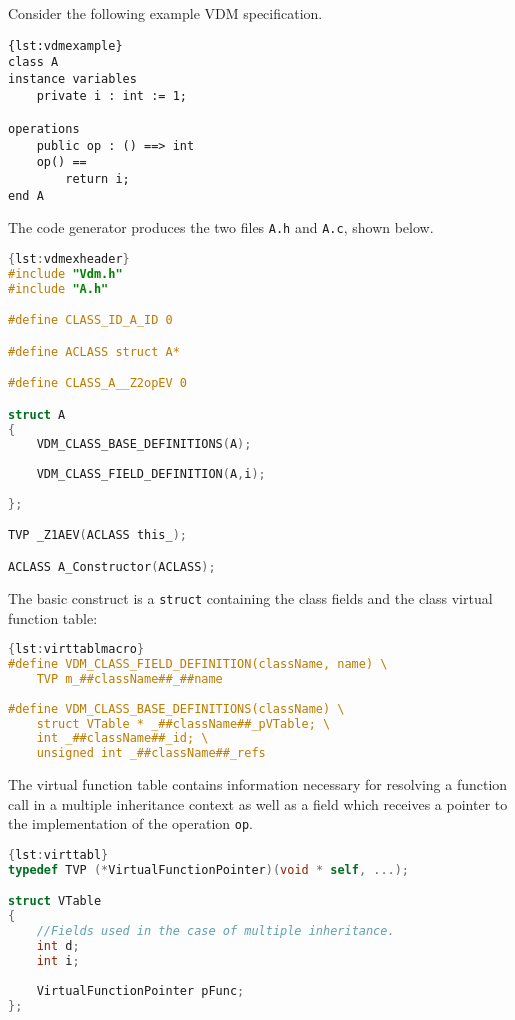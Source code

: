 Consider the following example VDM specification.
%
%
%
\begin{lstlisting}[language=VDM++,caption={Example VDM model.},label={lst:vdmexample},frame=tlbr]{lst:vdmexample}
class A
instance variables
	private i : int := 1;

operations
	public op : () ==> int
	op() ==
		return i;
end A
\end{lstlisting}
%
%
%
The code generator produces the two files \texttt{A.h} and \texttt{A.c}, shown below.
%
%
%
\begin{lstlisting}[language=C,caption={Corresponding header file \texttt{A.h}.},label={lst:vdmexheader},frame=tlbr]{lst:vdmexheader}
#include "Vdm.h"
#include "A.h"

#define CLASS_ID_A_ID 0

#define ACLASS struct A*

#define CLASS_A__Z2opEV 0

struct A
{
	VDM_CLASS_BASE_DEFINITIONS(A);
	 
	VDM_CLASS_FIELD_DEFINITION(A,i);
	
};

TVP _Z1AEV(ACLASS this_);

ACLASS A_Constructor(ACLASS);

\end{lstlisting}
%
%
%
The basic construct is a \texttt{struct} containing the class fields and the class virtual function table:
%
%
%
\begin{lstlisting}[language=C,caption={Macro for defining class virtual function tables.},label={lst:virttablmacro},frame=tlbr]{lst:virttablmacro}
#define VDM_CLASS_FIELD_DEFINITION(className, name) \
	TVP m_##className##_##name
	
#define VDM_CLASS_BASE_DEFINITIONS(className) \
	struct VTable * _##className##_pVTable; \
	int _##className##_id; \
	unsigned int _##className##_refs
\end{lstlisting}
%
%
%
The virtual function table contains information necessary for resolving a function call in a multiple inheritance context as well as a field which receives a pointer to the implementation of the operation \texttt{op}.
%
%
%
\begin{lstlisting}[language=C,caption={Virtual function table.},label={lst:virttablmacro},frame=tlbr]{lst:virttabl}
typedef TVP (*VirtualFunctionPointer)(void * self, ...);

struct VTable
{
	//Fields used in the case of multiple inheritance.
	int d;
	int i;
	
	VirtualFunctionPointer pFunc;
};
\end{lstlisting}

